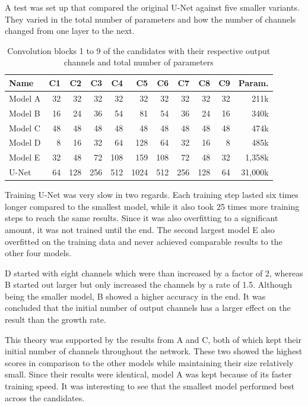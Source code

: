 A test was set up that compared the original U-Net against five smaller variants. They varied in the total number of parameters and how the number of channels changed from one layer to the next.

\begin{table}[h!]
    \centering
    \begin{tabular}{| l || r | r | r | r | r | r | r | r | r || r |}
    \hline
    Name    & C1   & C2   & C3   & C4   & C5   & C6   & C7   & C8   & C9  & Param. \\ 
    \hline
    \hline
    Model A &   32 &   32 &   32 &   32 &   32 &   32 &   32 &   32 &  32 & 211k      \\
    \hline
    Model B &   16 &   24 &   36 &   54 &   81 &   54 &   36 &   24 &  16 & 340k      \\
    \hline
    Model C &   48 &   48 &   48 &   48 &   48 &   48 &   48 &   48 &  48 & 474k      \\
    \hline
    Model D &    8 &   16 &   32 &   64 &  128 &   64 &   32 &   16 &   8 & 485k      \\
    \hline
    Model E &   32 &   48 &   72 &  108 &  159 &  108 &   72 &   48 &  32 & 1,358k      \\
    \hline
    U-Net   &   64 &  128 &  256 &  512 & 1024 &  512 &  256 &  128 &  64 & 31,000k      \\
    \hline
    \end{tabular}
    \caption{Convolution blocks 1 to 9 of the candidates with their respective output channels and total number of parameters}
\end{table}

Training U-Net was very slow in two regards. Each training step lasted six times longer compared to the smallest model, while it also took 25 times more training steps to reach the same results. Since it was also overfitting to a significant amount, it was not trained until the end. The second largest model E also overfitted on the training data and never achieved comparable results to the other four models.

D started with eight channels which were than increased by a factor of 2, whereas B started out larger but only increased the channels by a rate of 1.5. Although being the smaller model, B showed a higher accuracy in the end. It was concluded that the initial number of output channels has a larger effect on the result than the growth rate.

This theory was supported by the results from A and C, both of which kept their initial number of channels throughout the network. These two showed the highest scores in comparison to the other models while maintaining their size relatively small. Since their results were identical, model A was kept because of its faster training speed. It was interesting to see that the smallest model performed best across the candidates.


